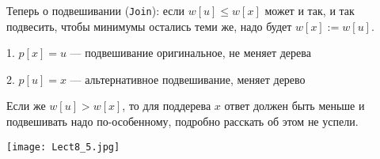 Теперь о подвешивании (\texttt{Join}): если $w[u] \le w[x]$ может и так, и так подвесить, чтобы минимумы остались теми же, надо будет $w[x] := w[u]$.

1. $p[x] = u$ — подвешивание оригинальное, не меняет дерева

2. $p[u] = x$ — альтернативное подвешивание, меняет дерево 


Если же $w[u] > w[x]$, то для поддерева $x$ ответ должен быть меньше и подвешивать надо по-особенному, подробно расскать об этом не успели. 


\texttt{[image: Lect8\_5.jpg]}\\

